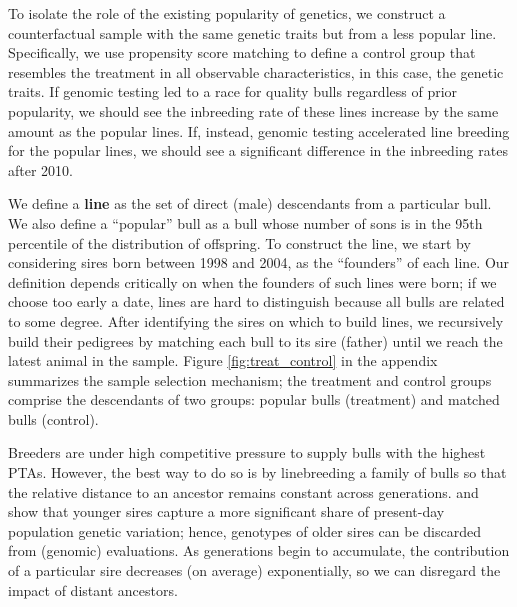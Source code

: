 \documentclass[12pt,letterpaper]{article}
\begin{document}
To isolate the role of the existing popularity of genetics, we construct a counterfactual sample with the same genetic traits but from a less popular line. Specifically, we use propensity score matching \citep{Smith2005} to define a control group that resembles the treatment in all observable characteristics, in this case, the genetic traits. If genomic testing led to a race for quality bulls regardless of prior popularity, we should see the inbreeding rate of these lines increase by the same amount as the popular lines. If, instead, genomic testing accelerated line breeding for the popular lines, we should see a significant difference in the inbreeding rates after 2010.

We define a \textbf{line} as the set of direct (male) descendants from a particular bull. We also define a ``popular'' bull as a bull whose number of sons is in the 95th percentile of the distribution of offspring. To construct the line, we start by considering sires born between 1998 and 2004, as the ``founders'' of each line. Our definition depends critically on when the founders of such lines were born; if we choose too early a date, lines are hard to distinguish because all bulls are related to some degree. After identifying the sires on which to build lines, we recursively build their pedigrees by matching each bull to its sire (father) until we reach the latest animal in the sample. Figure \ref{fig:treat_control} in the appendix summarizes the sample selection mechanism; the treatment and control groups comprise the descendants of two groups: popular bulls (treatment) and matched bulls (control).

Breeders are under high competitive pressure to supply bulls with the highest PTAs. However, the best way to do so is by linebreeding a family of bulls so that the relative distance to an ancestor remains constant across generations. \cite{Steyn2022} and \cite{Steyn2023} show that younger sires capture a more significant share of present-day population genetic variation; hence, genotypes of older sires can be discarded from (genomic) evaluations. As generations begin to accumulate, the contribution of a particular sire decreases (on average) exponentially, so we can disregard the impact of distant ancestors. 

\end{document}
